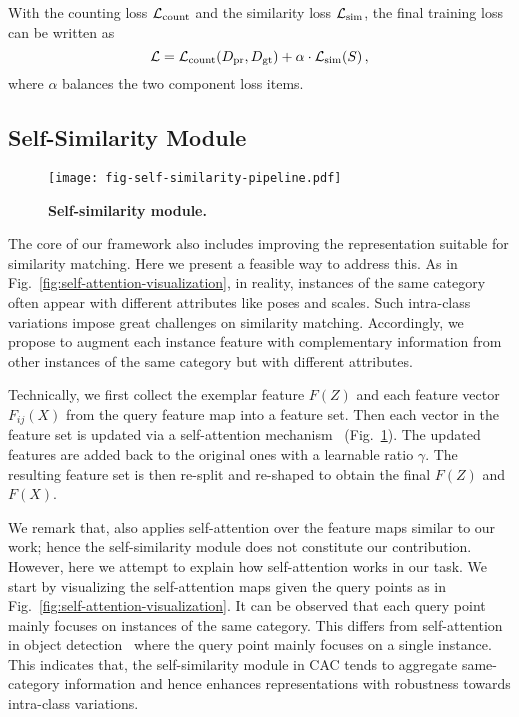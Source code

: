 \documentclass[10pt,twocolumn,letterpaper]{article}
\begin{document}
With the counting loss $\mathcal{L}_{\rm count}$ and the similarity loss $\mathcal{L}_{\rm sim}$, the final training loss can be written as \begin{equation}
\label{eq:total-loss}
    \mathcal{L} = \mathcal{L}_{\rm count}(D_{\rm pr}, D_{\rm gt}) + \alpha \cdot \mathcal{L}_{\rm sim}(S)\,,
\end{equation}
where $\alpha$ balances the two component loss items.

\subsection{Self-Similarity Module}
\begin{figure}[t]
    \centering
    \texttt{[image: fig-self-similarity-pipeline.pdf]}
    \vspace{-15pt}
    \caption{\textbf{Self-similarity module.}}
    \label{fig:self-attention-layer}
    \vspace{-5pt}
\end{figure}

The core of our framework also includes improving the representation suitable for similarity matching. Here we present a feasible way to address this. 
As in Fig.~\ref{fig:self-attention-visualization}, in reality, instances of the same category often appear with different attributes like poses and scales. Such intra-class variations impose great challenges on similarity matching. Accordingly, we propose to augment each instance feature with complementary information from other instances of the same category but with different attributes. 

Technically, we first collect the exemplar feature $F(Z)$ and each feature vector $F_{ij}(X)$ from the query feature map into a feature set. Then each vector in the feature set is updated via a self-attention mechanism~\cite{sa_gan} (Fig.~\ref{fig:self-attention-layer}). 
The updated features are added back to the original ones with a learnable ratio $\gamma$. The resulting feature set is then re-split and re-shaped to obtain the final $F(Z)$ and $F(X)$.

We remark that, \cite{cfocnet} also applies self-attention over the feature maps similar to our work; hence the self-similarity module does not constitute our contribution. However, here we attempt to explain how self-attention works in our task. We start by visualizing the self-attention maps given the query points as in Fig.~\ref{fig:self-attention-visualization}. It can be observed that each query point mainly focuses on instances of the same category. This differs from self-attention in object detection~\cite{detr} where the query point mainly focuses on a single instance. This indicates that, the self-similarity module in CAC tends to aggregate same-category information and hence enhances representations with robustness towards intra-class variations.
\end{document}
